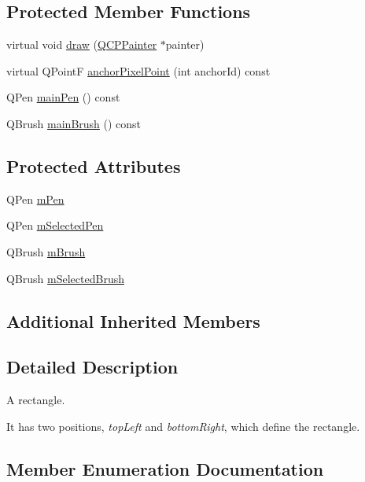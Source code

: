 \subsection*{Protected Member Functions}
\begin{DoxyCompactItemize}
\item 
virtual void \hyperlink{classQCPItemRect_a18cd583638b876cdd50f1a155ec182aa}{draw} (\hyperlink{classQCPPainter}{Q\+C\+P\+Painter} $\ast$painter)
\item 
virtual Q\+PointF \hyperlink{classQCPItemRect_ae0973f8281fb52361b0c99ee899be07e}{anchor\+Pixel\+Point} (int anchor\+Id) const 
\item 
Q\+Pen \hyperlink{classQCPItemRect_afa0fb7c6328a1e197ecd537de36daf8f}{main\+Pen} () const 
\item 
Q\+Brush \hyperlink{classQCPItemRect_ab0bd8e272e822ec851ba5b0c20e9200e}{main\+Brush} () const 
\end{DoxyCompactItemize}
\subsection*{Protected Attributes}
\begin{DoxyCompactItemize}
\item 
Q\+Pen \hyperlink{classQCPItemRect_aa0d49323628d6752026056bfb52afd86}{m\+Pen}
\item 
Q\+Pen \hyperlink{classQCPItemRect_a73cc0bee61de3c67221ec8c7a76a29ed}{m\+Selected\+Pen}
\item 
Q\+Brush \hyperlink{classQCPItemRect_a2d7f207fada27588b3a52b19234d3c2e}{m\+Brush}
\item 
Q\+Brush \hyperlink{classQCPItemRect_a21b70eee59b6e19ae0bbdf037b13508f}{m\+Selected\+Brush}
\end{DoxyCompactItemize}
\subsection*{Additional Inherited Members}


\subsection{Detailed Description}
A rectangle. 

 It has two positions, {\itshape top\+Left} and {\itshape bottom\+Right}, which define the rectangle. 

\subsection{Member Enumeration Documentation}
